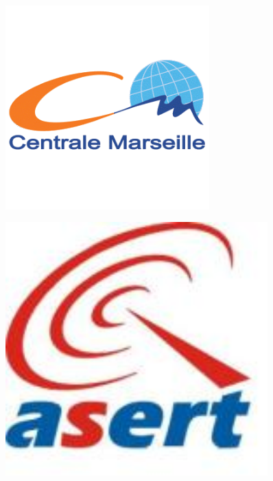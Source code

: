 \begin{titlepage}
\begin{center}

\begin{figure}[ht]
\begin{minipage}[b]{0.5\linewidth}
\centering
\includegraphics[width=0.7\textwidth]{img/logo_ecm}
\label{logo_ecm}
\end{minipage}
\hspace{0.5cm}
\begin{minipage}[b]{0.5\linewidth}
\centering
\includegraphics[width=0.9\textwidth]{img/logo_asert}
\label{logo_asert}
\end{minipage}
\end{figure}


\end{center}
\end{titlepage}
